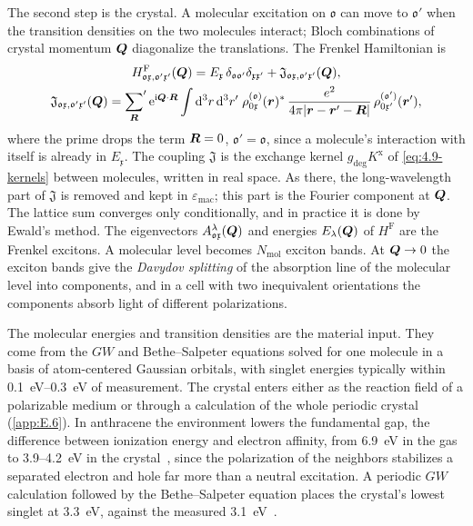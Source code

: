 The second step is the crystal. A molecular excitation on $\mathfrak{o}$ can move to $\mathfrak{o}'$ when the transition densities on the two molecules interact; Bloch combinations of crystal momentum $\bm{Q}$ diagonalize the translations. The Frenkel Hamiltonian is
\begin{equation}
  \begin{gathered}
  H^{\mathrm{F}}_{\mathfrak{o}\mathfrak{x},\mathfrak{o}'\mathfrak{x}'}(\bm{Q}) = E_{\mathfrak{x}}\,\delta_{\mathfrak{o}\mathfrak{o}'}\delta_{\mathfrak{x}\mathfrak{x}'} + \mathfrak{J}_{\mathfrak{o}\mathfrak{x},\mathfrak{o}'\mathfrak{x}'}(\bm{Q}) ,\\
  \mathfrak{J}_{\mathfrak{o}\mathfrak{x},\mathfrak{o}'\mathfrak{x}'}(\bm{Q}) = {\sum_{\bm{R}}}'\,\mathrm{e}^{\mathrm{i}\bm{Q}\cdot\bm{R}}\int\mathrm{d}^3r\,\mathrm{d}^3r'\;\rho^{(\mathfrak{o})}_{0\mathfrak{x}}(\bm{r})^*\,\frac{e^2}{4\pi|\bm{r} - \bm{r}' - \bm{R}|}\,\rho^{(\mathfrak{o}')}_{0\mathfrak{x}'}(\bm{r}') ,
  \end{gathered}
  \label{eq:16.4-HF}
\end{equation}
where the prime drops the term $\bm{R} = 0$, $\mathfrak{o}' = \mathfrak{o}$, since a molecule's interaction with itself is already in $E_{\mathfrak{x}}$. The coupling $\mathfrak{J}$ is the exchange kernel $g_{\mathrm{deg}}K^{\mathrm{x}}$ of \cref{eq:4.9-kernels} between molecules, written in real space. As there, the long-wavelength part of $\mathfrak{J}$ is removed and kept in $\varepsilon_{\mathrm{mac}}$; this part is the Fourier component at $\bm{Q}$. The lattice sum converges only conditionally, and in practice it is done by Ewald's method. The eigenvectors $A^\lambda_{\mathfrak{o}\mathfrak{x}}(\bm{Q})$ and energies $E_\lambda(\bm{Q})$ of $H^{\mathrm{F}}$ are the Frenkel excitons. A molecular level becomes $N_{\mathrm{mol}}$ exciton bands. At $\bm{Q} \to 0$ the exciton bands give the \emph{Davydov splitting} of the absorption line of the molecular level into components, and in a cell with two inequivalent orientations the components absorb light of different polarizations.

The molecular energies and transition densities are the material input. They come from the $GW$ and Bethe--Salpeter equations solved for one molecule in a basis of atom-centered Gaussian orbitals, with singlet energies typically within \SIrange{0.1}{0.3}{eV} of measurement. The crystal enters either as the reaction field of a polarizable medium or through a calculation of the whole periodic crystal (\cref{app:E.6}). In anthracene the environment lowers the fundamental gap, the difference between ionization energy and electron affinity, from \SI{6.9}{eV} in the gas to 3.9--\SI{4.2}{eV} in the crystal~\cite[Tables~I--III]{rangel2016structural}, since the polarization of the neighbors stabilizes a separated electron and hole far more than a neutral excitation. A periodic $GW$ calculation followed by the Bethe--Salpeter equation places the crystal's lowest singlet at \SI{3.3}{eV}, against the measured \SI{3.1}{eV}~\cite[Table~III]{rangel2016structural}.

